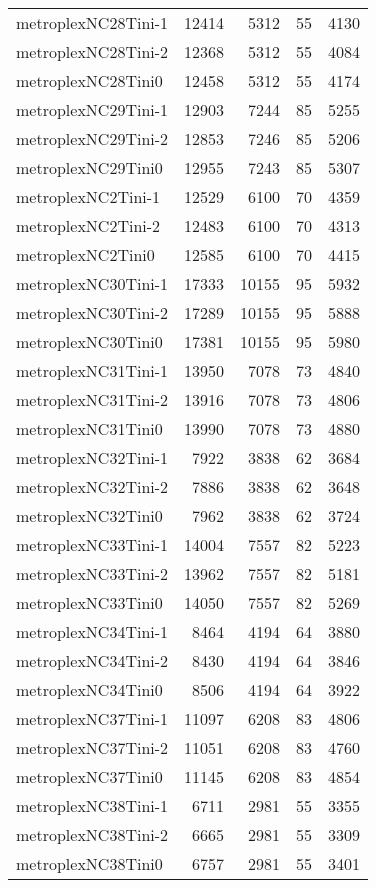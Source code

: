 \begin{longtable}{lrrrr}
metroplexNC28Tini-1 & 12414 & 5312 & 55 & 4130 \\
metroplexNC28Tini-2 & 12368 & 5312 & 55 & 4084 \\
metroplexNC28Tini0 & 12458 & 5312 & 55 & 4174 \\
metroplexNC29Tini-1 & 12903 & 7244 & 85 & 5255 \\
metroplexNC29Tini-2 & 12853 & 7246 & 85 & 5206 \\
metroplexNC29Tini0 & 12955 & 7243 & 85 & 5307 \\
metroplexNC2Tini-1 & 12529 & 6100 & 70 & 4359 \\
metroplexNC2Tini-2 & 12483 & 6100 & 70 & 4313 \\
metroplexNC2Tini0 & 12585 & 6100 & 70 & 4415 \\
metroplexNC30Tini-1 & 17333 & 10155 & 95 & 5932 \\
metroplexNC30Tini-2 & 17289 & 10155 & 95 & 5888 \\
metroplexNC30Tini0 & 17381 & 10155 & 95 & 5980 \\
metroplexNC31Tini-1 & 13950 & 7078 & 73 & 4840 \\
metroplexNC31Tini-2 & 13916 & 7078 & 73 & 4806 \\
metroplexNC31Tini0 & 13990 & 7078 & 73 & 4880 \\
metroplexNC32Tini-1 & 7922 & 3838 & 62 & 3684 \\
metroplexNC32Tini-2 & 7886 & 3838 & 62 & 3648 \\
metroplexNC32Tini0 & 7962 & 3838 & 62 & 3724 \\
metroplexNC33Tini-1 & 14004 & 7557 & 82 & 5223 \\
metroplexNC33Tini-2 & 13962 & 7557 & 82 & 5181 \\
metroplexNC33Tini0 & 14050 & 7557 & 82 & 5269 \\
metroplexNC34Tini-1 & 8464 & 4194 & 64 & 3880 \\
metroplexNC34Tini-2 & 8430 & 4194 & 64 & 3846 \\
metroplexNC34Tini0 & 8506 & 4194 & 64 & 3922 \\
metroplexNC37Tini-1 & 11097 & 6208 & 83 & 4806 \\
metroplexNC37Tini-2 & 11051 & 6208 & 83 & 4760 \\
metroplexNC37Tini0 & 11145 & 6208 & 83 & 4854 \\
metroplexNC38Tini-1 & 6711 & 2981 & 55 & 3355 \\
metroplexNC38Tini-2 & 6665 & 2981 & 55 & 3309 \\
metroplexNC38Tini0 & 6757 & 2981 & 55 & 3401 \\

\end{longtable}
